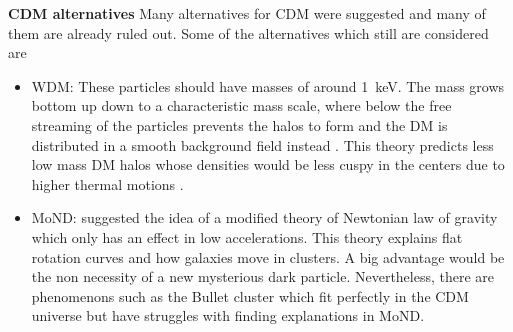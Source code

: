 \textbf{\ac{CDM} alternatives} Many alternatives for \ac{CDM} were suggested and many of them are already ruled out. Some of the alternatives which still are considered are 
\begin{itemize}
    \item \ac{WDM}: These particles should have masses of around \SI{1}{keV}. The mass grows bottom up down to a characteristic mass scale, where below the free streaming of the particles prevents the halos to form and the \ac{DM} is distributed in a smooth background field instead \citep{Smith...WDM..2011, Schneider...WDM...2013}. This theory predicts less low mass \ac{DM} halos whose densities would be less cuspy in the centers due to higher thermal motions \citep{Bode...WDM...2001}.
    \item \ac{MoND}: \cite{Milgrom...MoND...1983} suggested the idea of a modified theory of Newtonian law of gravity which only has an effect in low accelerations. This theory explains flat rotation curves and how galaxies move in clusters. A big advantage would be the non necessity of a new mysterious dark particle. Nevertheless, there are phenomenons such as the Bullet cluster \citep{Clowe...Bullett...2006} which fit perfectly in the \ac{CDM} universe but have struggles with finding explanations in \ac{MoND}.
\end{itemize}

